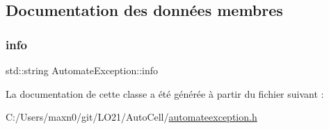 \subsection{Documentation des données membres}
\mbox{\label{class_automate_exception_a016b50d51f7b0ff70ce26394e4004760}} 
\subsubsection{\texorpdfstring{info}{info}}
{\footnotesize\ttfamily std\+::string Automate\+Exception\+::info\hspace{0.3cm}{\ttfamily [private]}}



La documentation de cette classe a été générée à partir du fichier suivant \+:\begin{DoxyCompactItemize}
\item 
C\+:/\+Users/maxn0/git/\+L\+O21/\+Auto\+Cell/\mbox{\hyperlink{automateexception_8h}{automateexception.\+h}}\end{DoxyCompactItemize}
